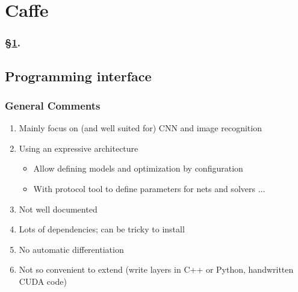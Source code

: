 
\section{Caffe}\label{sec:Caffe}


\frameinlbffalse

{

\begin{frame}[plain]
\frametitle{\S\ref{sec:Caffe}. \insertsection}
\listofframes
\end{frame}
\addtocounter{framenumber}{-1} %

}

\frameinlbftrue

\subsection{Programming interface}

\begin{frame}
  \MyLogo
  \frametitle{General Comments}  

\begin{enumerate}
\item Mainly focus on (and well suited for) CNN and image recognition 
\item Using an expressive architecture 
\begin{itemize}
\item Allow defining models and optimization by configuration
\item With protocol tool to define parameters for nets and solvers $\ldots$
\end{itemize}
\item Not well documented
\item Lots of dependencies; can be tricky to install
\item No automatic differentiation
\item Not so convenient to extend (write layers in C++ or Python, handwritten CUDA code)
\end{enumerate}

\end{frame}


